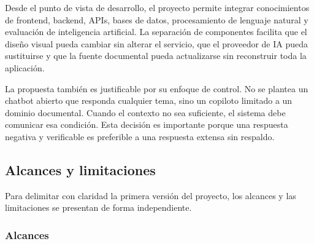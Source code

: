 Desde el punto de vista de desarrollo, el proyecto permite integrar conocimientos de frontend, backend, APIs, bases de datos, procesamiento de lenguaje natural y evaluación de inteligencia artificial. La separación de componentes facilita que el diseño visual pueda cambiar sin alterar el servicio, que el proveedor de IA pueda sustituirse y que la fuente documental pueda actualizarse sin reconstruir toda la aplicación.

La propuesta también es justificable por su enfoque de control. No se plantea un chatbot abierto que responda cualquier tema, sino un copiloto limitado a un dominio documental. Cuando el contexto no sea suficiente, el sistema debe comunicar esa condición. Esta decisión es importante porque una respuesta negativa y verificable es preferible a una respuesta extensa sin respaldo.

\subsection{Alcances y limitaciones}

Para delimitar con claridad la primera versión del proyecto, los alcances y las limitaciones se presentan de forma independiente.

\subsubsection{Alcances}

